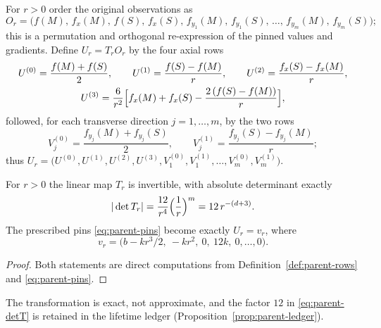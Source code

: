 \begin{definition}\label{def:parent-rows}
For $r>0$ order the original observations as
\[
O_r=\bigl(f(M),\,f_x(M),\,f(S),\,f_x(S),\,f_{y_1}(M),\,f_{y_1}(S),\,\dots,\,f_{y_m}(M),\,f_{y_m}(S)\bigr);
\]
this is a permutation and orthogonal re-expression of the pinned values and gradients. Define $U_r=T_rO_r$ by the four axial rows
\begin{equation}\label{eq:parent-rows}
\begin{gathered}
U^{(0)}=\frac{f(M)+f(S)}2,\qquad U^{(1)}=\frac{f(S)-f(M)}r,\qquad U^{(2)}=\frac{f_x(S)-f_x(M)}r,\\
U^{(3)}=\frac6{r^2}\Bigl[f_x(M)+f_x(S)-\frac{2\,(f(S)-f(M))}r\Bigr],
\end{gathered}
\end{equation}
followed, for each transverse direction $j=1,\dots,m$, by the two rows
\[
V^{(0)}_j=\frac{f_{y_j}(M)+f_{y_j}(S)}2,\qquad V^{(1)}_j=\frac{f_{y_j}(S)-f_{y_j}(M)}r ;
\]
thus $U_r=\bigl(U^{(0)},U^{(1)},U^{(2)},U^{(3)},V^{(0)}_1,V^{(1)}_1,\dots,V^{(0)}_m,V^{(1)}_m\bigr)$.
\end{definition}

\begin{lemma}\label{lem:parent-frame}
For $r>0$ the linear map $T_r$ is invertible, with absolute determinant exactly
\begin{equation}\label{eq:parent-detT}
|\det T_r|=\frac{12}{r^4}\Bigl(\frac1r\Bigr)^{m}=12\,r^{-(d+3)} .
\end{equation}
The prescribed pins \eqref{eq:parent-pins} become exactly $U_r=v_r$, where
\begin{equation}\label{eq:parent-target}
v_r=\bigl(b-kr^3/2,\ -kr^2,\ 0,\ 12k,\ 0,\dots,0\bigr).
\end{equation}
\end{lemma}

\begin{proof}
Both statements are direct computations from Definition~\ref{def:parent-rows} and \eqref{eq:parent-pins}.
\end{proof}

The transformation is exact, not approximate, and the factor $12$ in \eqref{eq:parent-detT} is retained in the lifetime ledger (Proposition~\ref{prop:parent-ledger}).

